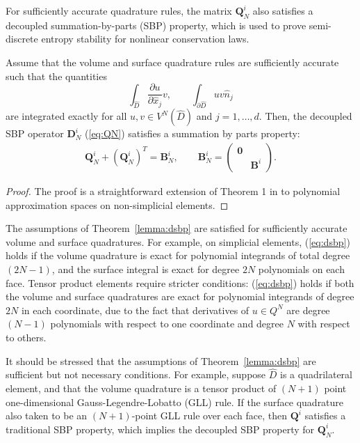 \documentclass{svjour3}                     %
\renewcommand{\hat}{\widehat}
\newcommand{\pd}[2]{\frac{\partial#1}{\partial#2}}
\newcommand{\LRp}[1]{\left( #1 \right)}
\begin{document}
For sufficiently accurate quadrature rules, the matrix $\bm{Q}^i_N$ also satisfies a decoupled summation-by-parts (SBP) property, which is used to prove semi-discrete entropy stability for nonlinear conservation laws.  
\begin{theorem}%
Assume that the volume and surface quadrature rules are sufficiently accurate such that the quantities
\[
\int_{\hat{D}} \pd{u}{\hat{x}_j} v, \qquad \int_{\partial \hat{D}} u v \hat{n}_j
\]
are integrated exactly for all $u,v \in V^N\LRp{\hat{D}}$ and $j = 1,\ldots, d$.  Then, the decoupled SBP operator $\bm{D}^i_N$ (\ref{eq:QN}) satisfies a summation by parts property:
\begin{gather}
\bm{Q}^i_N+\LRp{\bm{Q}^i_N}^T = \bm{B}^i_N, \qquad \bm{B}^i_N = \LRp{\begin{array}{cc}\bm{0}&\\ & \bm{B}^i\end{array}}.\label{eq:dsbp}
\end{gather}
\label{lemma:dsbp}
\end{theorem}
\begin{proof}
The proof is a straightforward extension of Theorem 1 in \cite{chan2017discretely} to polynomial approximation spaces on non-simplicial elements.  
\end{proof}

The assumptions of Theorem~\ref{lemma:dsbp} are satisfied for sufficiently accurate volume and surface quadratures.  For example, on simplicial elements, (\ref{eq:dsbp}) holds if the volume quadrature is exact for polynomial integrands of total degree $(2N-1)$, and the surface integral is exact for degree $2N$ polynomials on each face.  Tensor product elements require stricter conditions: (\ref{eq:dsbp}) holds if both the volume and surface quadratures are exact for polynomial integrands of degree $2N$ in each coordinate, due to the fact that derivatives of $u\in Q^N$ are degree $(N-1)$ polynomials with respect to one coordinate and degree $N$ with respect to others.  

\begin{remark}
It should be stressed that the assumptions of Theorem~\ref{lemma:dsbp} are sufficient but not necessary conditions.  For example, suppose $\hat{D}$ is a quadrilateral element, and that the volume quadrature is a tensor product of $(N+1)$ point one-dimensional Gauss-Legendre-Lobatto (GLL) rule.  If the surface quadrature also taken to be an $(N+1)$-point GLL rule over each face, then $\bm{Q}^i$ satisfies a traditional SBP property, which implies the decoupled SBP property for $\bm{Q}^i_N$.  
\end{remark}
\end{document}
